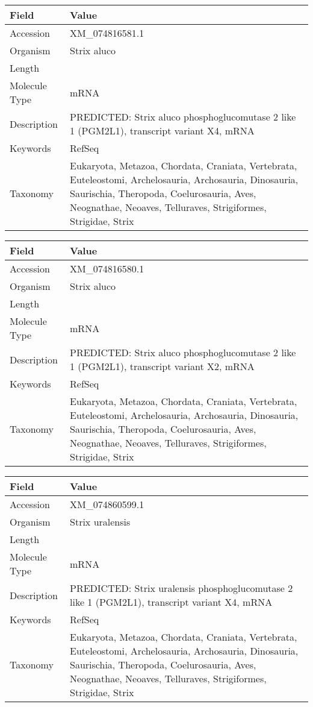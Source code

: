 \documentclass[10pt]{article}
\begin{document}
{\footnotesize
\begin{longtable}{>{\raggedright\arraybackslash}p{4.5cm} >{\raggedright\arraybackslash}p{11.5cm}}
\textbf{Field} & \textbf{Value} \\
\hline
Accession & XM\_074816581.1 \\
Organism & Strix aluco \\
Length & 6322 \\
Molecule Type & mRNA \\
Description & PREDICTED: Strix aluco phosphoglucomutase 2 like 1 (PGM2L1), transcript variant X4, mRNA \\
Keywords & RefSeq \\
Taxonomy & Eukaryota, Metazoa, Chordata, Craniata, Vertebrata, Euteleostomi, Archelosauria, Archosauria, Dinosauria, Saurischia, Theropoda, Coelurosauria, Aves, Neognathae, Neoaves, Telluraves, Strigiformes, Strigidae, Strix \\
\end{longtable}
}

{\footnotesize
\begin{longtable}{>{\raggedright\arraybackslash}p{4.5cm} >{\raggedright\arraybackslash}p{11.5cm}}
\textbf{Field} & \textbf{Value} \\
\hline
Accession & XM\_074816580.1 \\
Organism & Strix aluco \\
Length & 6281 \\
Molecule Type & mRNA \\
Description & PREDICTED: Strix aluco phosphoglucomutase 2 like 1 (PGM2L1), transcript variant X2, mRNA \\
Keywords & RefSeq \\
Taxonomy & Eukaryota, Metazoa, Chordata, Craniata, Vertebrata, Euteleostomi, Archelosauria, Archosauria, Dinosauria, Saurischia, Theropoda, Coelurosauria, Aves, Neognathae, Neoaves, Telluraves, Strigiformes, Strigidae, Strix \\
\end{longtable}
}

{\footnotesize
\begin{longtable}{>{\raggedright\arraybackslash}p{4.5cm} >{\raggedright\arraybackslash}p{11.5cm}}
\textbf{Field} & \textbf{Value} \\
\hline
Accession & XM\_074860599.1 \\
Organism & Strix uralensis \\
Length & 6323 \\
Molecule Type & mRNA \\
Description & PREDICTED: Strix uralensis phosphoglucomutase 2 like 1 (PGM2L1), transcript variant X4, mRNA \\
Keywords & RefSeq \\
Taxonomy & Eukaryota, Metazoa, Chordata, Craniata, Vertebrata, Euteleostomi, Archelosauria, Archosauria, Dinosauria, Saurischia, Theropoda, Coelurosauria, Aves, Neognathae, Neoaves, Telluraves, Strigiformes, Strigidae, Strix \\
\end{longtable}
}
\end{document}
